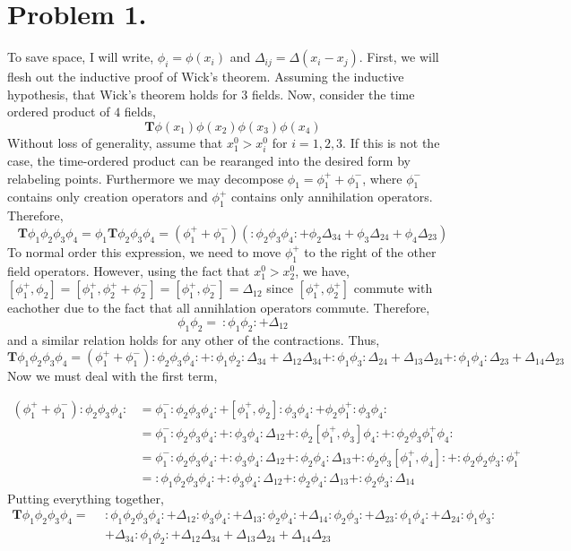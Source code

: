\documentclass[12pt]{extarticle}
\begin{document}
 
\section*{Problem 1.}
To save space, I will write, $\phi_i = \phi(x_i)$ and $\Delta_{ij} = \Delta(x_i - x_j)$. First, we will flesh out the inductive proof of Wick's theorem. Assuming the inductive hypothesis, that Wick's theorem holds for $3$ fields. Now, consider the time ordered product of $4$ fields,
	\[ \mathbf{T} \phi(x_1) \phi(x_2) \phi(x_3) \phi(x_4)\]
Without loss of generality, assume that $x_1^0 > x_i^0$ for $i = 1,2,3$. If this is not the case, the time-ordered product can be rearanged into the desired form by relabeling points. Furthermore we may decompose $\phi_1 = \phi_1^+ + \phi_1^-$, where $\phi_1^-$ contains only creation operators and $\phi_1^+$ contains only annihilation operators. Therefore,
	\[ \mathbf{T} \phi_1\phi_2\phi_3\phi_4 = \phi_1 \mathbf{T}\phi_2\phi_3\phi_4 = (\phi_1^+ + \phi_1^-) \left(
	: \phi_2 \phi_3 \phi_4 : + \phi_2 \Delta_{34} + \phi_3 \Delta_{24} + \phi_4 \Delta_{23} \right) \]
To normal order this expression, we need to move $\phi_1^+$ to the right of the other field operators. However, using the fact that $x_1^0 > x_2^0$, we have, $[\phi_1^+, \phi_2] = [\phi_1^+, \phi_2^+ + \phi_2^-] = [\phi_1^+, \phi_2^-] = \Delta_{12}$ since $[\phi_1^+, \phi_2^+]$ commute with eachother due to the fact that all annihlation operators commute. Therefore,
\[ \phi_1 \phi_2 = \: : \phi_1 \phi_2 : + \Delta_{12} \] 
and a similar relation holds for any other of the contractions. Thus, 
\[ \mathbf{T} \phi_1\phi_2\phi_3\phi_4 = (\phi_1^+ + \phi_1^-) : \phi_2 \phi_3 \phi_4 : + :\phi_1 \phi_2: \Delta_{34} + \Delta_{12} \Delta_{34} + :\phi_1 \phi_3 : \Delta_{24} + \Delta_{13} \Delta_{24} + : \phi_1  \phi_4: \Delta_{23} + \Delta_{14} \Delta_{23} \]
Now we must deal with the first term,	
	
\begin{align*} 
(\phi_1^+ + \phi_1^-) : \phi_2 \phi_3 \phi_4 : & = \phi_1^- : \phi_2 \phi_3 \phi_4 : + [\phi_1^+, \phi_2] : \phi_3 \phi_4 : + \phi_2 \phi_1^+ : \phi_3 \phi_4 : 
\\
& = \phi_1^- : \phi_2 \phi_3 \phi_4 : +  : \phi_3 \phi_4 : \Delta_{12} + :\phi_2 [\phi_1^+ , \phi_3] \phi_4 : + :\phi_2 \phi_3 \phi_1^+ \phi_4 : 
\\
& = \phi_1^- : \phi_2 \phi_3 \phi_4 : + : \phi_3 \phi_4 : \Delta_{12} + :\phi_2 \phi_4 : \Delta_{13} + :\phi_2 \phi_3 [\phi_1^+, \phi_4] : + : \phi_2 \phi_2 \phi_3 : \phi_1^+
\\
& = : \phi_1 \phi_2 \phi_3 \phi_4: + : \phi_3 \phi_4 : \Delta_{12} + :\phi_2 \phi_4 : \Delta_{13} + :\phi_2 \phi_3 : \Delta_{14}
\end{align*}
Putting everything together,
\begin{align*}
\mathbf{T} \phi_1\phi_2\phi_3\phi_4  =  \: \: & : \phi_1 \phi_2 \phi_3 \phi_4: +  \Delta_{12} : \phi_3 \phi_4 : + \Delta_{13} :\phi_2 \phi_4 : + \Delta_{14} : \phi_2 \phi_3 : + \Delta_{23} : \phi_1  \phi_4: + \Delta_{24} :\phi_1 \phi_3 :
\\ 
& + \Delta_{34} : \phi_1 \phi_2 : + \Delta_{12} \Delta_{34} + \Delta_{13} \Delta_{24}  + \Delta_{14} \Delta_{23}
\end{align*}
\end{document}
